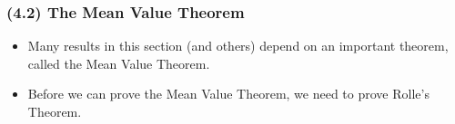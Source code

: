 \begin{frame}
\frametitle{(4.2) The Mean Value Theorem}
\begin{itemize}
\item  Many results in this section (and others) depend on an important theorem, called the Mean Value Theorem.
\item  Before we can prove the Mean Value Theorem, we need to prove Rolle's Theorem.
\end{itemize}
\end{frame}

